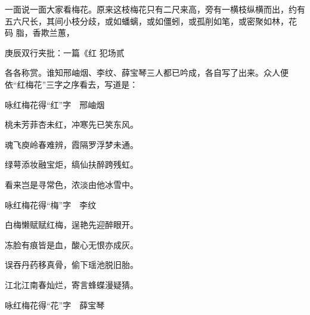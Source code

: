 \begin{parag}
    一面说一面大家看梅花。原来这枝梅花只有二尺来高，旁有一横枝纵横而出，约有五六尺长，其间小枝分歧，或如蟠螭，或如僵蚓，或孤削如笔，或密聚如林，花 码 脂，香欺兰蕙，\begin{note}庚辰双行夹批：一篇《红 犯场贰\end{note}各各称赏。谁知邢岫烟、李纹、薛宝琴三人都已吟成，各自写了出来。众人便依“红梅花”三字之序看去，写道是：
\end{parag}


\begin{poem}
    \begin{pl}

        咏红梅花得“红”字　邢岫烟
    \end{pl}
    \begin{pl}

        桃未芳菲杏未红，冲寒先已笑东风。
    \end{pl}
    \begin{pl}

        魂飞庾岭春难辨，霞隔罗浮梦未通。
    \end{pl}
    \begin{pl}

        绿萼添妆融宝炬，缟仙扶醉跨残虹。
    \end{pl}
    \begin{pl}

        看来岂是寻常色，浓淡由他冰雪中。
    \end{pl}
    \emptypl

    \begin{pl}
        咏红梅花得“梅”字　李纹
    \end{pl}
    \begin{pl}

        白梅懒赋赋红梅，逞艳先迎醉眼开。
    \end{pl}
    \begin{pl}

        冻脸有痕皆是血，酸心无恨亦成灰。
    \end{pl}
    \begin{pl}

        误吞丹药移真骨，偷下瑶池脱旧胎。
    \end{pl}
    \begin{pl}

        江北江南春灿烂，寄言蜂蝶漫疑猜。
    \end{pl}
    \emptypl

    \begin{pl}
        咏红梅花得“花”字　薛宝琴
    \end{pl}
    \begin{pl}


\end{pl}
\end{poem}
